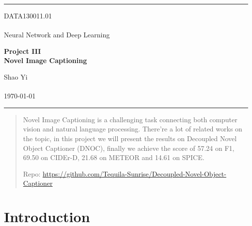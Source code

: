 \documentclass[a4paper, 11pt]{article} %
\begin{document}

\fancyhead[C]{}
\hrule \medskip %
\begin{minipage}{0.295\textwidth} %
	\raggedright
	DATA130011.01\\ %
	\footnotesize %
	\hfill\\
	Neural Network and Deep Learning\\ %
\end{minipage}
\begin{minipage}{0.4\textwidth} %
	\centering
	\large %
	\textbf{Project III}\\ %
	\normalsize %
	\textbf{Novel Image Captioning}\\ %
\end{minipage}
\begin{minipage}{0.295\textwidth} %
	\raggedleft
	Shao Yi\\ %
	\footnotesize %
	\hfill\\
	\today\\ %
\end{minipage}
\medskip\hrule %
\bigskip


\begin{abstract}
	Novel Image Captioning is a challenging task connecting both computer vision and natural
	language processing. There're a lot of related works on the topic, in this project we
	will present the results on Decoupled Novel Object Captioner (DNOC), finally we achieve
	the score of 57.24 on F1, 69.50 on CIDEr-D, 21.68 on METEOR and 14.61 on SPICE.

	Repo: \url{https://github.com/Tequila-Sunrise/Decoupled-Novel-Object-Captioner}
\end{abstract}

\bigskip


\section{\textbf{Introduction}}
\end{document}
